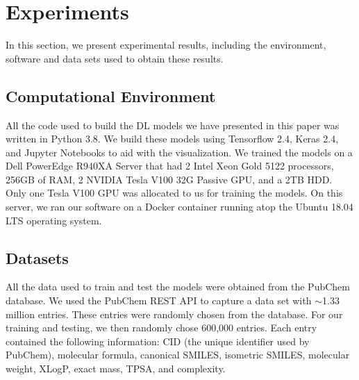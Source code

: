 \graphicspath{ {./figures/} }
\section{Experiments \label{experiments}}
	In this section, we present experimental results, including the environment, software  and data sets used to obtain these results.
    \subsection{Computational Environment}
    All the code used to build the DL models we have presented in this paper was written in Python 3.8. We build these models  using Tensorflow 2.4, Keras 2.4, and Jupyter Notebooks to aid with the visualization. 
    We trained the models on  a Dell PowerEdge R940XA Server that had 2 Intel Xeon Gold 5122 processors, 256GB of RAM, 2 NVIDIA Tesla V100 32G Passive GPU, and a 2TB HDD. Only one Tesla V100 GPU was allocated to us for training the models. On this server, we ran our software on a Docker container running atop the Ubuntu 18.04 LTS operating system. 
    
    \subsection{Datasets}
    All the data used to train and test the models were obtained from the PubChem database. We used the PubChem REST API to capture
    a data set with  $\sim$1.33 million entries. These entries were randomly chosen from the database. For our training and testing, we  then randomly 
	chose 600,000 entries. Each entry contained the following information: CID (the unique identifier used by PubChem), molecular formula, canonical SMILES, isometric SMILES, molecular weight, XLogP, exact mass, TPSA, and complexity.
	
